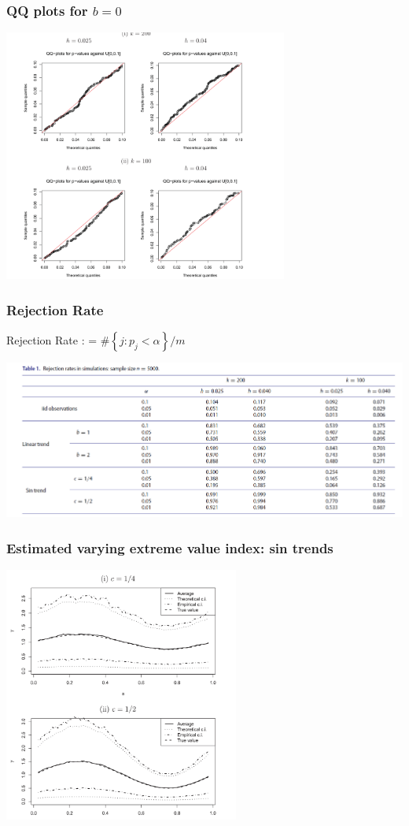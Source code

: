 \documentclass{beamer}
\newcommand{\set}[1]{\left\{#1\right\}}
\begin{document}
\begin{frame}
    \frametitle{QQ plots for $b=0$}
\begin{center}
    \includegraphics[width=0.7\textwidth]{QQ.png}
\end{center}
\end{frame}

\begin{frame}
    \frametitle{Rejection Rate}
Rejection Rate : = \#$\set{j: p_j<\alpha}/m$
    \begin{center}
        \includegraphics[width=1\textwidth]{image-20200429225741056}
    \end{center}

\end{frame}

\begin{frame}
    \frametitle{Estimated varying extreme value index: sin trends}
\begin{center}
    \includegraphics[width=0.58\textwidth]{image-20200429225848297}
\end{center}
    

\end{frame}
\end{document}
